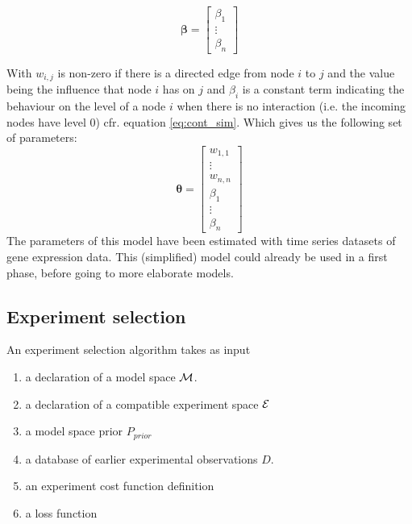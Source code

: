 \documentclass{article}
\begin{document}
\begin{equation}
 \mathbf{\beta} = \begin{bmatrix}
      \beta_1 \\
      \vdots \\
      \beta_n 
     \end{bmatrix}
\end{equation}

With $w_{i,j}$ is non-zero if there is a directed edge from node $i$ to $j$ and the value being the influence that node $i$ has on $j$ and $\beta_i$ is a constant term indicating the behaviour on the level of a node $i$ 
when there is no interaction (i.e. the incoming nodes have level 0) cfr. equation \ref{eq:cont_sim}. Which gives us the following set of parameters:
\begin{equation}
 \mathbf{\theta} = \begin{bmatrix}
                     w_{1,1} \\
                     \vdots \\
                     w_{n,n} \\
                     \beta_1 \\
                     \vdots \\
                     \beta_n
                    \end{bmatrix}
% 
\end{equation}
The parameters of this model have been estimated with time series datasets of gene expression data. This (simplified) model could already be used in a first phase, before going to more elaborate models.

\subsection{Experiment selection}

An experiment selection algorithm takes as input

\begin{enumerate}
\item a declaration of a model space $\mathcal{M}$.
\item a declaration of a compatible experiment space $\mathcal{E}$
\item a model space prior $P_{prior}$
\item a database of earlier experimental observations $D$.
\item an experiment cost function definition
\item a loss function
\end{enumerate}
\end{document}

